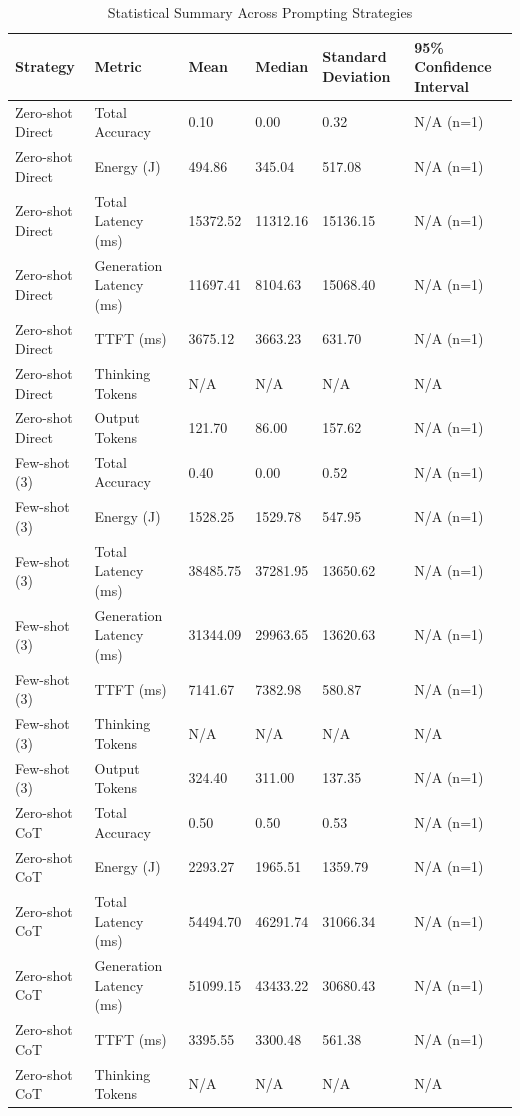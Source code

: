 \begin{table}
\caption{Statistical Summary Across Prompting Strategies}
\label{tab:statistical_summary}
\begin{tabular}{llllll}
\toprule
Strategy & Metric & Mean & Median & Standard Deviation & 95\% Confidence Interval \\
\midrule
Zero-shot Direct & Total Accuracy & 0.10 & 0.00 & 0.32 & N/A (n=1) \\
Zero-shot Direct & Energy (J) & 494.86 & 345.04 & 517.08 & N/A (n=1) \\
Zero-shot Direct & Total Latency (ms) & 15372.52 & 11312.16 & 15136.15 & N/A (n=1) \\
Zero-shot Direct & Generation Latency (ms) & 11697.41 & 8104.63 & 15068.40 & N/A (n=1) \\
Zero-shot Direct & TTFT (ms) & 3675.12 & 3663.23 & 631.70 & N/A (n=1) \\
Zero-shot Direct & Thinking Tokens & N/A & N/A & N/A & N/A \\
Zero-shot Direct & Output Tokens & 121.70 & 86.00 & 157.62 & N/A (n=1) \\
Few-shot (3) & Total Accuracy & 0.40 & 0.00 & 0.52 & N/A (n=1) \\
Few-shot (3) & Energy (J) & 1528.25 & 1529.78 & 547.95 & N/A (n=1) \\
Few-shot (3) & Total Latency (ms) & 38485.75 & 37281.95 & 13650.62 & N/A (n=1) \\
Few-shot (3) & Generation Latency (ms) & 31344.09 & 29963.65 & 13620.63 & N/A (n=1) \\
Few-shot (3) & TTFT (ms) & 7141.67 & 7382.98 & 580.87 & N/A (n=1) \\
Few-shot (3) & Thinking Tokens & N/A & N/A & N/A & N/A \\
Few-shot (3) & Output Tokens & 324.40 & 311.00 & 137.35 & N/A (n=1) \\
Zero-shot CoT & Total Accuracy & 0.50 & 0.50 & 0.53 & N/A (n=1) \\
Zero-shot CoT & Energy (J) & 2293.27 & 1965.51 & 1359.79 & N/A (n=1) \\
Zero-shot CoT & Total Latency (ms) & 54494.70 & 46291.74 & 31066.34 & N/A (n=1) \\
Zero-shot CoT & Generation Latency (ms) & 51099.15 & 43433.22 & 30680.43 & N/A (n=1) \\
Zero-shot CoT & TTFT (ms) & 3395.55 & 3300.48 & 561.38 & N/A (n=1) \\
Zero-shot CoT & Thinking Tokens & N/A & N/A & N/A & N/A \\

\end{tabular}
\end{table}
